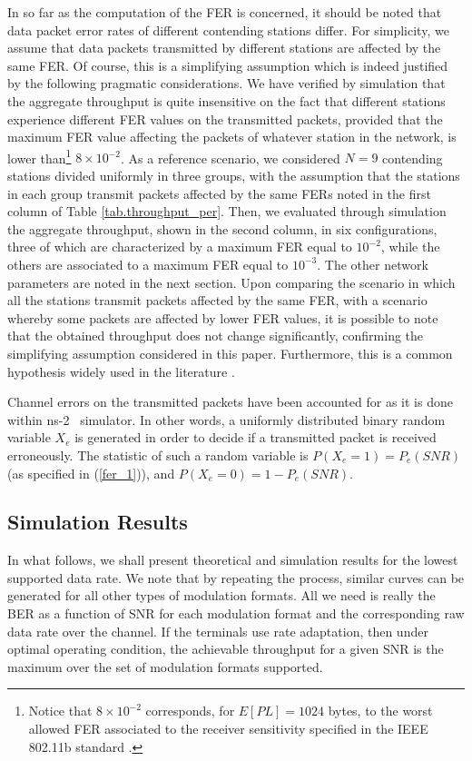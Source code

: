 \documentclass[10pt,onecolumn,a4paper]{IEEEtran}
\begin{document}
In so far as the computation of the FER is concerned, it should be
noted that data packet error rates of different contending
stations differ. For simplicity, we assume that data packets
transmitted by different stations are affected by the same FER. Of
course, this is a simplifying assumption which is indeed justified
by the following pragmatic considerations. We have verified by
simulation that the aggregate throughput is quite insensitive on
the fact that different stations experience different FER values
on the transmitted packets, provided that the maximum FER value
affecting the packets of whatever station in the network, is lower
than\footnote{Notice that $8\times 10^{-2}$ corresponds, for
$E[PL]=1024$ bytes, to the worst allowed FER associated to the
receiver sensitivity specified in the IEEE 802.11b standard
\cite{standard_DCF_MAC}.} $8\times 10^{-2}$. As a reference
scenario, we considered $N=9$ contending stations divided
uniformly in three groups, with the assumption that the stations
in each group transmit packets affected by the same FERs noted in
the first column of Table \ref{tab.throughput_per}. Then, we
evaluated through simulation the aggregate throughput, shown in
the second column, in six configurations, three of which are
characterized by a maximum FER equal to $10^{-2}$, while the
others are associated to a maximum FER equal to $10^{-3}$. The
other network parameters are noted in the next section. Upon
comparing the scenario in which all the stations transmit packets
affected by the same FER, with a scenario whereby some packets are
affected by lower FER values, it is possible to note that the
obtained throughput does not change significantly, confirming the
simplifying assumption considered in this paper. Furthermore, this
is a common hypothesis widely used in the literature
\cite{Chatzimisios}.

Channel errors on the transmitted packets have been accounted for
as it is done within ns-2~\cite{xiuchao} simulator. In other words, a
uniformly distributed binary random variable $X_e$ is generated in
order to decide if a transmitted packet is received erroneously.
The statistic of such a random variable is $P(X_e=1)=P_e(SNR)$ (as
specified in (\ref{fer_1})), and $P(X_e=0)=1-P_e(SNR)$.
\subsection{Simulation Results}
In what follows, we shall present theoretical and simulation
results for the lowest supported data rate. We note that by
repeating the process, similar curves can be generated for all
other types of modulation formats. All we need is really the BER
as a function of SNR for each modulation format and the
corresponding raw data rate over the channel. If the terminals use
rate adaptation, then under optimal operating condition, the
achievable throughput for a given SNR is the maximum over the set
of modulation formats supported.
\end{document}

